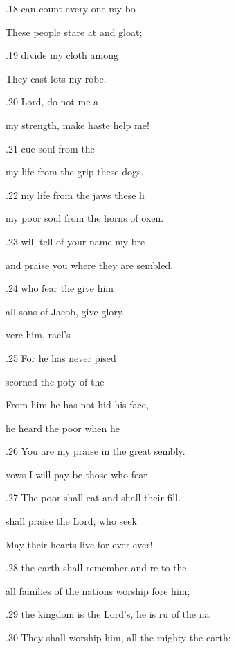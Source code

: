 .18  can count every one  my bo 

These people stare at  and gloat; 

.19  divide my cloth among  

They cast lots  my robe. 

.20  Lord, do not  me a 

my strength, make haste  help me! 

.21 cue  soul from the  

my life from the grip  these dogs. 

.22  my life from the jaws  these li 

my poor soul from the horns of  oxen. 

.23  will tell of your name  my bre 

and praise you where they are sembled. 

.24  who fear the  give him  

all sons of Jacob, give  glory. 

vere him, rael's  

.25 For he has never pised 

 scorned the poty of the  

From him he has not hid his face, 

 he heard the poor  when he  

.26 You are my praise in the great sembly. 

 vows I will pay be those who fear  

.27 The poor shall eat and shall  their fill. 

 shall praise the Lord,  who seek  

May their hearts live for ever  ever! 

.28  the earth shall remember and re to the  

all families of the nations worship fore him; 

.29  the kingdom is the Lord's, he is ru of the na 

.30 They shall worship him, all the mighty  the earth; 

